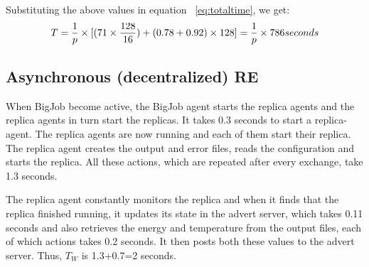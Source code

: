\documentclass{rspublic}
\begin{document}

Substituting the above values in equation ~\ref{eq:totaltime}, we get:
\begin{eqnarray}
T=  {1 \over p} \times {[({71 \times {128 \over 16}}) + (0.78 + 0.92)\times 128]} = {1 \over p} \times 786 seconds
\label{eq:timebt}
\end{eqnarray}


\subsection{Asynchronous (decentralized) RE}

When BigJob become active, the BigJob agent starts the replica agents and
the replica agents in turn start the replicas. It takes 0.3 seconds to start a replica-agent.
The replica agents are now
running and each of them start their replica. The replica agent creates the output
and error files, reads the configuration and starts the replica. All
these actions, which are repeated after every exchange, take 1.3
seconds.

The replica agent constantly monitors the replica and when it finds
that the replica finished running, it updates its state in the advert
server, which takes 0.11 seconds and also retrieves the energy and
temperature from the output files, each of which actions takes 0.2
seconds. It then posts both these values to the advert server. Thus,
$T_W$ is 1.3+0.7=2 seconds.
\end{document}
